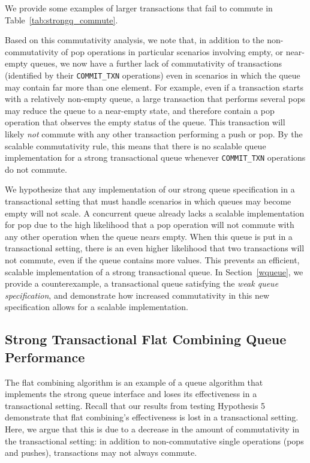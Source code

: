 We provide some examples of larger transactions that fail to commute in Table~\ref{tab:strongq_commute}.

Based on this commutativity analysis, we note that, in addition to the non-commutativity of pop operations in particular scenarios involving empty, or near-empty queues, we now have a further lack of commutativity of transactions (identified by their \texttt{COMMIT\_TXN} operations) even in scenarios in which the queue may contain far more than one element. For example, even if a transaction starts with a relatively non-empty queue, a large transaction that performs several pops may reduce the queue to a near-empty state, and therefore contain a pop operation that observes the empty status of the queue. This transaction will likely \emph{not} commute with any other transaction performing a push or pop.  By the scalable commutativity rule, this means that there is no scalable queue implementation for a strong transactional queue whenever \texttt{COMMIT\_TXN} operations do not commute.

We hypothesize that any implementation of our strong queue specification in a transactional setting that must handle scenarios in which queues may become empty will not scale. A concurrent queue already lacks a scalable implementation for pop due to the high likelihood that a pop operation will not commute with any other operation when the queue nears empty. When this queue is put in a transactional setting, there is an even higher likelihood that two transactions will not commute, even if the queue contains more values. This prevents an efficient, scalable implementation of a strong transactional queue. In Section~\ref{wqueue}, we provide a counterexample, a transactional queue satisfying the \emph{weak queue specification}, and demonstrate how increased commutativity in this new specification allows for a scalable implementation.

\subsection{Strong Transactional Flat Combining Queue Performance}
The flat combining algorithm is an example of a queue algorithm that implements the strong queue interface and loses its effectiveness in a transactional setting. Recall that our results from testing Hypothesis 5 demonstrate that flat combining's effectiveness is lost in a transactional setting. Here, we argue that this is due to a decrease in the amount of commutativity in the transactional setting: in addition to non-commutative single operations (pops and pushes), transactions may not always commute.

